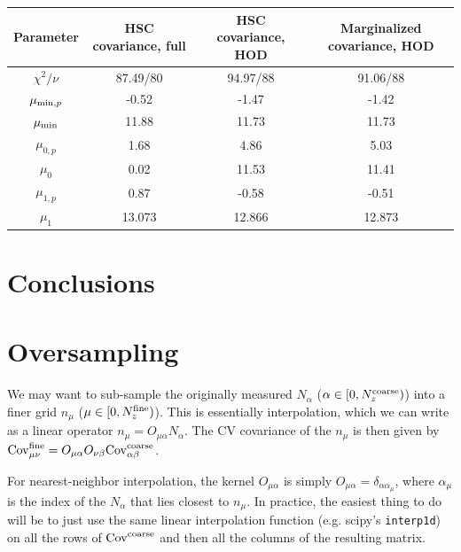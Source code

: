 \documentclass[a4paper,11pt]{article}
\begin{document}
\begin{center}
 \begin{tabular}{c | c c c} 
 \hline\hline
 Parameter & HSC covariance, full & HSC covariance, HOD & Marginalized covariance, HOD \\ [0.5ex] 
 \hline
 $\chi^2/\nu$ & 87.49/80 & 94.97/88 & 91.06/88 \\ 

 $\mu_{{\rm min},p}$ & -0.52 & -1.47 & -1.42 \\

 $\mu_{\rm min}$ & 11.88 & 11.73 & 11.73 \\

 $\mu_{0,p}$ & 1.68 & 4.86 & 5.03 \\
 
 $\mu_{0}$ & 0.02 & 11.53 & 11.41 \\

 $\mu_{1,p}$ & 0.87 & -0.58 & -0.51 \\

 $\mu_{1}$ & 13.073 & 12.866 & 12.873 \\ [1ex] 
 \hline
 \hline
\end{tabular}
\end{center}


\section{Conclusions}

\appendix
\section{Oversampling}
We may want to sub-sample the originally measured $N_{\alpha}$ ($\alpha\in[0,N_z^{\rm coarse})$) into a finer grid $n_{\mu}$ ($\mu\in[0,N_z^{\rm fine})$). This is essentially interpolation, which we can write as a linear operator $n_\mu = O_{\mu\alpha}N_{\alpha}$. The CV covariance of the $n_\mu$ is then given by ${\rm Cov}^{\rm fine}_{\mu\nu}=O_{\mu\alpha}O_{\nu\beta}{\rm Cov}^{\rm coarse}_{\alpha\beta}$.

For nearest-neighbor interpolation, the kernel $O_{\mu\alpha}$ is simply $O_{\mu\alpha}=\delta_{\alpha\alpha_\mu}$, where $\alpha_\mu$ is the index of the $N_\alpha$ that lies closest to $n_\mu$. In practice, the easiest thing to do will be to just use the same linear interpolation function (e.g. scipy's {\tt interp1d}) on all the rows of ${\rm Cov}^{\rm coarse}$ and then all the columns of the resulting matrix.



\end{document}
